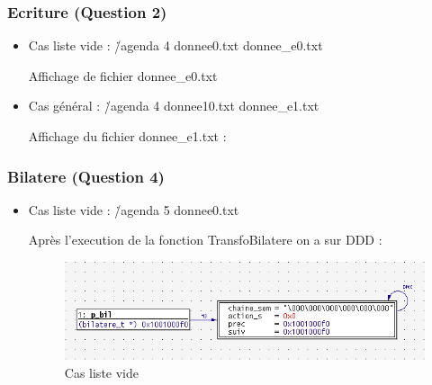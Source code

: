 \documentclass{report}
\begin{document}
\subsubsection{Ecriture (Question 2)}
\begin{itemize}
    \item Cas liste vide : \./agenda 4 donnee0.txt donnee\_e0.txt
\vspace{0.5cm}

\vspace{0.5cm}

Affichage de fichier donnee\_e0.txt
\vspace{0.5cm}

\vspace{0.5cm}

    \item Cas général : \./agenda 4 donnee10.txt donnee\_e1.txt
\vspace{0.5cm}

\vspace{0.5cm}

Affichage du fichier donnee\_e1.txt :
\vspace{0.5cm}

\end{itemize}

\newpage
\subsubsection{Bilatere (Question 4)}
\begin{itemize}
    \item Cas liste vide : \./agenda 5 donnee0.txt

\vspace{0.5cm}

\vspace{0.5cm}

Après l'execution de la fonction TransfoBilatere on a sur DDD :
\begin{figure}[!h] 
    \begin{center}
    \includegraphics[width=15cm]{liste_vide.png}
    \caption{Cas liste vide} %
    \end{center}
\end{figure}
\end{itemize}
\end{document}
